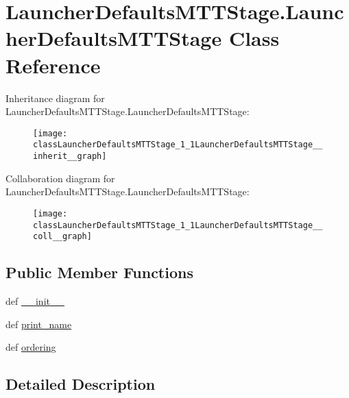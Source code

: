 \hypertarget{classLauncherDefaultsMTTStage_1_1LauncherDefaultsMTTStage}{\section{Launcher\-Defaults\-M\-T\-T\-Stage.\-Launcher\-Defaults\-M\-T\-T\-Stage Class Reference}
\label{classLauncherDefaultsMTTStage_1_1LauncherDefaultsMTTStage}
}


Inheritance diagram for Launcher\-Defaults\-M\-T\-T\-Stage.\-Launcher\-Defaults\-M\-T\-T\-Stage\-:\nopagebreak
\begin{figure}[H]
\begin{center}
\leavevmode
\texttt{[image: classLauncherDefaultsMTTStage\_1\_1LauncherDefaultsMTTStage\_\_inherit\_\_graph]}
\end{center}
\end{figure}


Collaboration diagram for Launcher\-Defaults\-M\-T\-T\-Stage.\-Launcher\-Defaults\-M\-T\-T\-Stage\-:\nopagebreak
\begin{figure}[H]
\begin{center}
\leavevmode
\texttt{[image: classLauncherDefaultsMTTStage\_1\_1LauncherDefaultsMTTStage\_\_coll\_\_graph]}
\end{center}
\end{figure}
\subsection*{Public Member Functions}
\begin{DoxyCompactItemize}
\item 
def \hyperlink{classLauncherDefaultsMTTStage_1_1LauncherDefaultsMTTStage_a3210162653ca613c61633efb3ed4e573}{\-\_\-\-\_\-init\-\_\-\-\_\-}
\item 
def \hyperlink{classLauncherDefaultsMTTStage_1_1LauncherDefaultsMTTStage_a9358965c1e1bf813dd350a79eaf234de}{print\-\_\-name}
\item 
def \hyperlink{classLauncherDefaultsMTTStage_1_1LauncherDefaultsMTTStage_a11c3a5f1ae358d7af699440261ab163d}{ordering}
\end{DoxyCompactItemize}


\subsection{Detailed Description}


